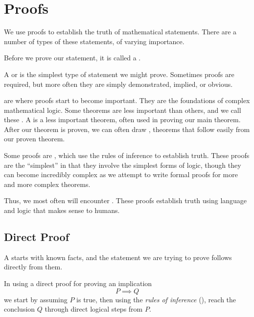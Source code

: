 \chapter{Proofs}
We use proofs to establish the truth of mathematical statements.
There are a number of types of these statements, of varying importance.

Before we prove our statement, it is called a
.

A  or  is the simplest type of statement we might
prove. Sometimes proofs are required, but more often they are simply
demonstrated, implied, or obvious.

 are where proofs start to become important. They are the
foundations of complex mathematical logic. Some theorems are
less important than others, and we call these .
A  is a less important theorem, often used in proving
our main theorem. After our theorem is proven, we can often draw
, theorems that follow
easily from our proven theorem.

Some proofs are , which use the rules of inference to
establish truth. These proofs are the ``simplest'' in that they involve the
simplest forms of logic, though they can become incredibly complex as we attempt
to write formal proofs for more and more complex theorems.

Thus, we most often will encounter .
These proofs establish truth using language and logic that makes sense to humans.

\section{Direct Proof}

A  starts with known facts, and the statement we are trying
to prove follows directly from them.

In using a direct proof for proving an implication \[P \implies Q\]
we start by assuming $P$ is true, then using the \emph{rules of inference}
(),
reach the conclusion $Q$ through direct logical steps from $P$.

